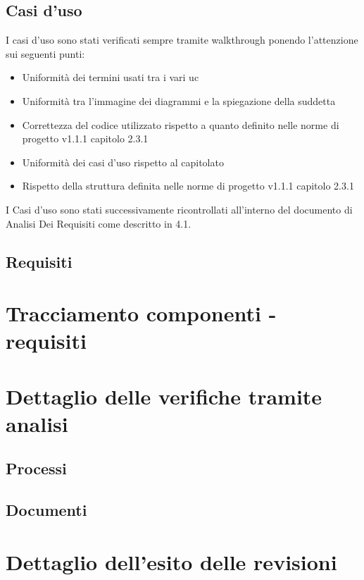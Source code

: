 \documentclass[a4paper]{report}
\begin{document}
			\subsection{Casi d'uso}
				I casi d'uso sono stati verificati sempre tramite walkthrough ponendo l'attenzione sui seguenti punti:
				\begin{itemize}
					\item Uniformità dei termini usati tra i vari uc
					\item Uniformità tra l'immagine dei diagrammi e la spiegazione della suddetta
					\item Correttezza del codice utilizzato rispetto a quanto definito nelle norme di progetto v1.1.1 capitolo
					2.3.1
					\item Uniformità dei casi d'uso rispetto al capitolato
					\item Rispetto della struttura definita nelle norme di progetto v1.1.1 capitolo 2.3.1
				\end{itemize}

				I Casi d'uso sono stati successivamente ricontrollati all'interno del documento di Analisi Dei Requisiti come
				descritto in 4.1.
			\subsection{Requisiti}
				
		\section{Tracciamento componenti - requisiti}
		
		\section{Dettaglio delle verifiche tramite analisi}
			\subsection{Processi}
			\subsection{Documenti}
		\section{Dettaglio dell'esito delle revisioni}
	
\end{document}
